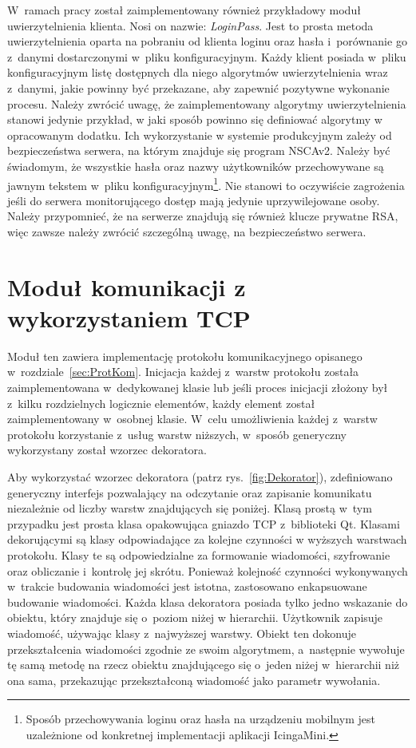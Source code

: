 W~ramach pracy został zaimplementowany również przykładowy moduł
uwierzytelnienia klienta. Nosi on nazwie: {\em LoginPass}. Jest to
prosta metoda uwierzytelnienia oparta na pobraniu od klienta loginu
oraz hasła i~porównanie go z~danymi dostarczonymi w~pliku
konfiguracyjnym. Każdy klient posiada w~pliku konfiguracyjnym listę
dostępnych dla niego algorytmów uwierzytelnienia wraz z~danymi, jakie
powinny być przekazane, aby zapewnić pozytywne wykonanie
procesu. Należy zwrócić uwagę, że zaimplementowany algorytmy
uwierzytelnienia stanowi jedynie przykład, w jaki sposób powinno się
definiować algorytmy w opracowanym dodatku. Ich wykorzystanie w
systemie produkcyjnym zależy od bezpieczeństwa serwera, na którym
znajduje się program NSCAv2. Należy być świadomym, że wszystkie hasła
oraz nazwy użytkowników przechowywane są jawnym tekstem w~pliku
konfiguracyjnym\footnote{Sposób przechowywania loginu oraz hasła na
  urządzeniu mobilnym jest uzależnione od konkretnej implementacji
  aplikacji IcingaMini.}. Nie stanowi to oczywiście zagrożenia jeśli
do serwera monitorującego dostęp mają jedynie uprzywilejowane
osoby. Należy przypomnieć, że na serwerze znajdują się również klucze
prywatne RSA, więc zawsze należy zwrócić szczególną uwagę, na
bezpieczeństwo serwera.

\section[Moduł TCP][Moduł komunikacji z wykorzystaniem TCP]{Moduł komunikacji z wykorzystaniem TCP}

Moduł ten zawiera implementację protokołu komunikacyjnego opisanego
w~rozdziale~\ref{sec:ProtKom}. Inicjacja każdej z~warstw protokołu
została zaimplementowana w~dedykowanej klasie lub jeśli proces
inicjacji złożony był z~kilku rozdzielnych logicznie elementów, każdy
element został zaimplementowany w~osobnej klasie. W~celu umożliwienia
każdej z~warstw protokołu korzystanie z~usług warstw niższych,
w~sposób generyczny wykorzystany został wzorzec dekoratora.

Aby wykorzystać wzorzec dekoratora (patrz rys.~\ref{fig:Dekorator}),
zdefiniowano generyczny interfejs pozwalający na odczytanie oraz
zapisanie komunikatu niezależnie od liczby warstw znajdujących się
poniżej. Klasą prostą w~tym przypadku jest prosta klasa opakowująca
gniazdo TCP z~biblioteki Qt. Klasami dekorującymi są klasy
odpowiadające za kolejne czynności w wyższych warstwach
protokołu. Klasy te są odpowiedzialne za formowanie wiadomości,
szyfrowanie oraz obliczanie i~kontrolę jej skrótu. Ponieważ kolejność
czynności wykonywanych w~trakcie budowania wiadomości jest istotna,
zastosowano enkapsuowane budowanie wiadomości. Każda klasa dekoratora
posiada tylko jedno wskazanie do obiektu, który znajduje się o~poziom
niżej w hierarchii. Użytkownik zapisuje wiadomość, używając klasy
z~najwyższej warstwy. Obiekt ten dokonuje przekształcenia wiadomości
zgodnie ze swoim algorytmem, a~następnie wywołuje tę samą metodę na
rzecz obiektu znajdującego się o~jeden niżej w~hierarchii niż ona
sama, przekazując przekształconą wiadomość jako parametr wywołania.

